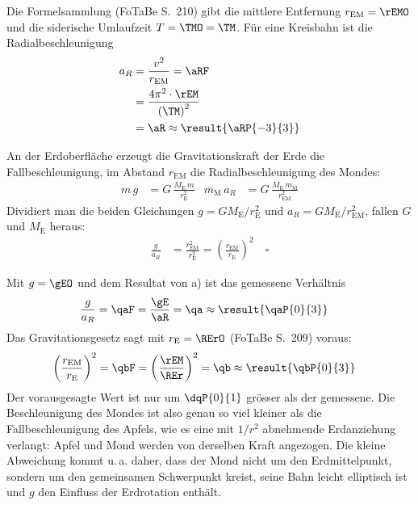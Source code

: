 \begin{abcliste}
\abc Die Formelsammlung (FoTaBe S.~210) gibt die mittlere Entfernung $r_\mathrm{EM} = \rEMO$ und die siderische Umlaufzeit $T = \TMO = \TM$. Für eine Kreisbahn ist die Radialbeschleunigung
\begin{align}
 a_R &= \frac{v^2}{r_\mathrm{EM}} = \aRF \\
   &= \frac{4\pi^2\cdot\rEM}{\left(\TM\right)^2} \\
   &= \aR \approx \result{\aRP{-3}{3}}
\end{align}

\abc An der Erdoberfläche erzeugt die Gravitationskraft der Erde die Fallbeschleunigung, im Abstand $r_\mathrm{EM}$ die Radialbeschleunigung des Mondes:
\begin{align}
 m\,g &= G\,\frac{M_\mathrm{E}\,m}{r_\mathrm{E}^2} &
 m_\mathrm{M}\,a_R &= G\,\frac{M_\mathrm{E}\,m_\mathrm{M}}{r_\mathrm{EM}^2}
\end{align}
Dividiert man die beiden Gleichungen $g = G M_\mathrm{E}/r_\mathrm{E}^2$ und $a_R = G M_\mathrm{E}/r_\mathrm{EM}^2$, fallen $G$ und $M_\mathrm{E}$ heraus:
\begin{align}
 \frac{g}{a_R} &= \frac{r_\mathrm{EM}^2}{r_\mathrm{E}^2} = \left(\frac{r_\mathrm{EM}}{r_\mathrm{E}}\right)^2 \quad\square
\end{align}

\abc Mit $g = \gEO$ und dem Resultat von a) ist das gemessene Verhältnis
\begin{align}
 \frac{g}{a_R} &= \qaF = \frac{\gE}{\aR} = \qa \approx \result{\qaP{0}{3}}
\end{align}
Das Gravitationsgesetz sagt mit $r_\mathrm{E} = \RErO$ (FoTaBe S.~209) voraus:
\begin{align}
 \left(\frac{r_\mathrm{EM}}{r_\mathrm{E}}\right)^2 &= \qbF = \left(\frac{\rEM}{\REr}\right)^2 = \qb \approx \result{\qbP{0}{3}}
\end{align}
Der vorausgesagte Wert ist nur um $\dqP{0}{1}$ grösser als der gemessene. Die Beschleunigung des Mondes ist also genau so viel kleiner als die Fallbeschleunigung des Apfels, wie es eine mit $1/r^2$ abnehmende Erdanziehung verlangt: Apfel und Mond werden von derselben Kraft angezogen. Die kleine Abweichung kommt u.\,a. daher, dass der Mond nicht um den Erdmittelpunkt, sondern um den gemeinsamen Schwerpunkt kreist, seine Bahn leicht elliptisch ist und $g$ den Einfluss der Erdrotation enthält.
\end{abcliste}
